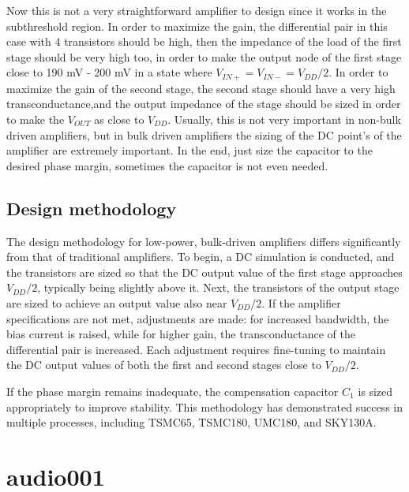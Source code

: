 \documentclass[12pt]{article}
\begin{document}
Now this is not a very straightforward amplifier to design since it works in the subthreshold region.
In order to maximize the gain, the differential pair in this case with 4 transistors should be high, then the impedance of the load of the first stage should be very high too, in order to make the output node of the first stage close to 190 mV - 200 mV in a state where $V_{IN+} = V_{IN-} = V_{DD}/2$. In order to maximize the gain of the second stage, the second stage should have a very high transconductance,and the output impedance of the stage should be sized in order to make the $V_{OUT}$ as close to $V_{DD}$. Usually, this is not very important in non-bulk driven amplifiers, but in bulk driven amplifiers the sizing of the DC point's of the amplifier are extremely important. In the end, just size the capacitor to the desired phase margin, sometimes the capacitor is not even needed.

\subsection{Design methodology}

The design methodology for low-power, bulk-driven amplifiers differs significantly from that of traditional amplifiers. To begin, a DC simulation is conducted, and the transistors are sized so that the DC output value of the first stage approaches \( V_{DD}/2 \), typically being slightly above it. Next, the transistors of the output stage are sized to achieve an output value also near \( V_{DD}/2 \). If the amplifier specifications are not met, adjustments are made: for increased bandwidth, the bias current is raised, while for higher gain, the transconductance of the differential pair is increased. Each adjustment requires fine-tuning to maintain the DC output values of both the first and second stages close to \( V_{DD}/2 \).

If the phase margin remains inadequate, the compensation capacitor \( C_1 \) is sized appropriately to improve stability. This methodology has demonstrated success in multiple processes, including TSMC65, TSMC180, UMC180, and SKY130A.










\section{audio001}
\end{document}

